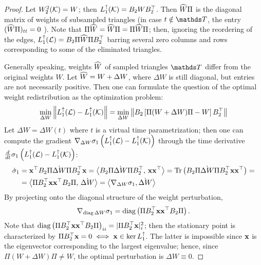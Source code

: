 \begin{proof}
      Let \( W_2^2(\mathcal{K} )= W \); then \( L_{1}^{\uparrow} (\mathcal{K}) = B_2 W B_2^\top \). Then \( \widehat{W} \Pi \) is the diagonal matrix of weights of subsampled triangles (in case \( t \notin \ds T \), the entry \( (\widehat{W} \Pi)_{tt} = 0 \) ). 
      Note that \( \Pi \widehat{W} = \widehat{W} \Pi = \Pi \widehat{W} \Pi\); then, ignoring the reordering of the edges, \( L_{1}^{\uparrow} (\mathcal{L} ) = B_2 \Pi \widehat{W} \Pi B_2^\top \) barring several zero columns and rows corresponding to some of the eliminated triangles.
      
Generally speaking, weights \( \widehat{W} \) of sampled triangles \( \ds T \) differ from the original weights \( W \). Let \( \widehat{W} = W + \Delta W\), where \( \Delta W \) is still diagonal, but entries are not necessarily positive. Then one can formulate the question of the optimal weight redistribution as the optimization problem:
\begin{equation*}
      \min_{ \Delta W } \left\| L_{1}^{\uparrow}(\mathcal{L}) - L_{1}^{\uparrow} (\mathcal{K}) \right\| = \min_{ \Delta W } \left\| B_2 \left[ \Pi( W + \Delta W ) \Pi - W \right] B_2^\top \right\|
\end{equation*}
Let \( \Delta W = \Delta W (t )\) where \(t \) is a virtual time parametrization; then one can compute the gradient \( \nabla_{\Delta W} \sigma_1 \left( L_{1}^{\uparrow}(\mathcal{L}) - L_{1}^{\uparrow} (\mathcal{K}) \right) \) through the time derivative \( \frac{d}{dt} \sigma_1 \left(  L_{1}^{\uparrow}(\mathcal{L}) - L_{1}^{\uparrow} (\mathcal{K}) \right)  \):
\begin{equation*}
      \begin{aligned}
            \dot{\sigma}_1 & = \mathbf{x}^\top B_2 \Pi \dot{ \Delta W } \Pi B_2^\top \mathbf{x} = \left\langle B_2 \Pi \dot{ \Delta W } \Pi B_2^\top , \, \mathbf{x} \mathbf{x}^\top \right\rangle = \mathrm{Tr} \left( B_2 \Pi \dot{ \Delta W } \Pi B_2^\top \mathbf{x} \mathbf{x}^\top \right) = \\ 
            & = \left\langle \Pi B_2^\top \mathbf{x} \mathbf{x}^\top B_2 \Pi , \, \dot{ \Delta W } \right\rangle = \left\langle \nabla_{\Delta W} \sigma_1, \dot{\Delta W } \right\rangle 
      \end{aligned}
\end{equation*}
By projecting onto the diagonal structure of the weight perturbation, 
\begin{equation*}
      \nabla_{\operatorname{diag} \Delta W } \sigma_1 = \operatorname{diag} \left( \Pi B_2^\top \mathbf{x} \mathbf{x}^\top B_2 \Pi  \right).      
\end{equation*}
Note that \( \operatorname{diag} \left( \Pi B_2^\top \mathbf{x} \mathbf{x}^\top B_2 \Pi  \right)_{ii} = |  \Pi B_2^\top \mathbf{x} |^2_i \); then the stationary point is characterized by \(  \Pi B_2^\top \mathbf{x} = 0 \iff \mathbf{x} \in \ker L_{1}^{\uparrow}\). The latter is impossible since \( \mathbf{x} \) is the eigenvector corresponding to the largest eigenvalue; hence, since \( \Pi (W + \Delta W ) \Pi \ne  W \), the optimal perturbation is \( \Delta W \equiv 0 \). 
\end{proof}

